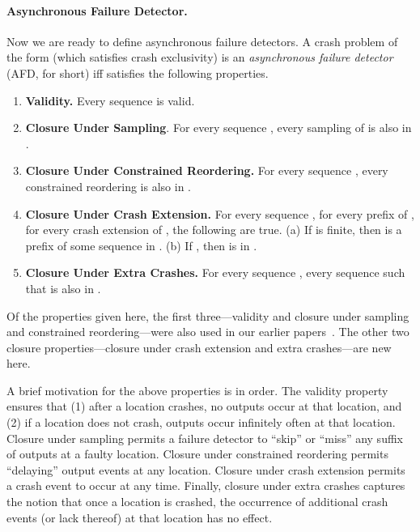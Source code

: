 \documentclass[11pt]{article}
\numberwithin{theorem}{section}
\begin{document}
\paragraph{Asynchronous Failure Detector.}
Now we are ready to define asynchronous failure detectors.
A crash problem of the form 
(which satisfies crash exclusivity) is an \emph{asynchronous failure
  detector} (AFD, for short) iff  satisfies the following
properties. 
\begin{enumerate}
\item \textbf{Validity.}
Every sequence  is valid.

\item \textbf{Closure Under Sampling}. For every sequence , every sampling of  is also in .

\item \textbf{Closure Under Constrained Reordering.} For every
  sequence , every constrained reordering  is also
  in . 

\item \textbf{Closure Under Crash Extension.} For every sequence , for every prefix  of , for every crash
  extension  of , the following are true. (a) If  is finite, then  is a
  prefix of some sequence in . (b) If ,
  then  is in .

\item \textbf{Closure Under Extra Crashes.} 
For every sequence , every sequence  such that
 is also in .
\end{enumerate}

Of the properties given here, the first three---validity and closure
under sampling and constrained reordering---were also used in our
earlier papers~\cite{cornejoetalAFD,cornejoetalAFD-TR}.
The other two closure properties---closure under crash extension and
extra crashes---are new here.  

A brief motivation for the above properties is in order. The validity
property ensures that (1) after a location crashes, no outputs occur
at that location, and (2) if a location does not crash, outputs occur
infinitely often at that location. Closure under sampling permits a
failure detector to ``skip'' or ``miss'' any suffix of outputs at a faulty
location. Closure under constrained reordering permits ``delaying''
output events at any location. Closure under crash extension permits a
crash event to occur at any time. Finally, closure under extra crashes
captures the notion that once a location is crashed, the occurrence of
additional crash events (or lack thereof) at that location has no
effect.
\end{document}

